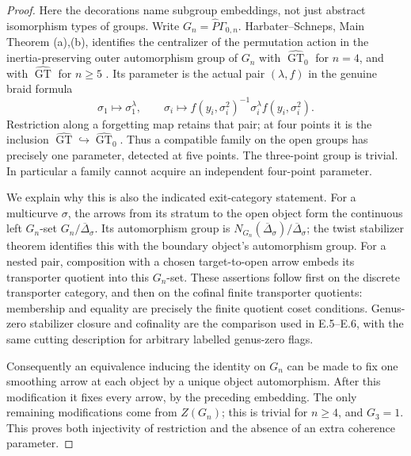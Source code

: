 \begin{proof}
Here the decorations name subgroup embeddings, not just abstract
isomorphism types of groups.  Write $G_n=\widehat P\Gamma_{0,n}$.
Harbater--Schneps, Main Theorem (a),(b), identifies the centralizer of
the permutation action in the inertia-preserving outer automorphism
group of $G_n$ with $\widehat{\operatorname{GT}}_0$ for $n=4$, and
with $\widehat{\operatorname{GT}}$ for $n\geq5$
\cite[pp.~1--3, Main Theorem]{ET_HS2000}.  Its parameter is the
actual pair $(\lambda,f)$ in the genuine braid formula
\[
 \sigma_1\longmapsto\sigma_1^\lambda,\qquad
 \sigma_i\longmapsto
 f(y_i,\sigma_i^2)^{-1}\sigma_i^\lambda f(y_i,\sigma_i^2).
                                                               \tag{E.29}
\]
Restriction along a forgetting map retains that pair; at four
points it is the inclusion
$\widehat{\operatorname{GT}}\hookrightarrow
\widehat{\operatorname{GT}}_0$.  Thus a compatible family on the
open groups has precisely one parameter, detected at five points.
The three-point group is trivial.  In particular a family cannot
acquire an independent four-point parameter.

We explain why this is also the indicated exit-category statement.
For a multicurve $\sigma$, the arrows from its stratum to the open
object form the continuous left $G_n$-set
$G_n/\overline\Delta_\sigma$.  Its automorphism group is
$N_{G_n}(\overline\Delta_\sigma)/\overline\Delta_\sigma$;
the twist stabilizer theorem identifies this with the boundary
object's automorphism group.  For a nested pair, composition with
a chosen target-to-open arrow embeds its transporter quotient
into this $G_n$-set.  These assertions follow first on the
discrete transporter category, and then on the cofinal finite
transporter quotients: membership and equality are precisely the
finite quotient coset conditions.  Genus-zero stabilizer closure
and cofinality are the comparison used in E.5--E.6, with the same
cutting description for arbitrary labelled genus-zero flags.

Consequently an equivalence inducing the identity on $G_n$ can
be made to fix one smoothing arrow at each object by a unique
object automorphism.  After this modification it fixes every
arrow, by the preceding embedding.  The only remaining
modifications come from $Z(G_n)$; this is trivial for $n\geq4$,
and $G_3=1$.  This proves both injectivity of restriction and the
absence of an extra coherence parameter.


\end{proof}
